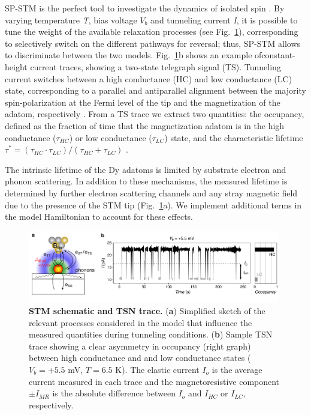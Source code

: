 \documentclass[
reprint,amsmath,amssymb,aps]{revtex4-2}
\begin{document}
SP-STM is the perfect tool to investigate the dynamics of isolated spin \cite{wiesendanger_ObservationVacuumTunneling_1990,Khajetoorians2013,paul_ControlMillisecondSpin_2017,Natterer2017,Natterer2018}. By varying temperature \textit{T}, bias voltage $V_b$ and tunneling current \textit{I}, it is possible to tune the weight of the available relaxation processes (see Fig.~\ref{fig:no_tip_tip_telegraph}), corresponding to selectively switch on the different pathways for reversal; thus, SP-STM allows to discriminate between the two models. 
Fig.~\ref{fig:no_tip_tip_telegraph}b shows an example ofconstant-height current traces, showing a two-state
telegraph signal (TS). Tunneling current switches between a high conductance (HC) and low conductance (LC) state, corresponding to a parallel and antiparallel alignment between the majority spin-polarization at the Fermi level of the tip and the magnetization of the adatom, respectively \cite{delgado2010,paul_ControlMillisecondSpin_2017}. From a TS trace we extract two quantities: the occupancy, defined as the fraction of time that the magnetization adatom is in the high conductance ($\tau_{HC}$) or low conductance ($\tau_{LC}$) state, and the characteristic lifetime $\tau ^*=(\tau_{HC}  \cdot \tau_{LC})/( \tau_{HC} + \tau_{LC})$ \cite{Khajetoorians2013}. 

The intrinsic lifetime of the Dy adatoms is limited by substrate electron and phonon scattering. In addition to these mechanisms, the measured lifetime is determined by further electron scattering channels and any stray magnetic field due to the presence of the STM tip (Fig.~\ref{fig:no_tip_tip_telegraph}a). We implement additional terms in the model Hamiltonian to account for these effects. 

\begin{figure}[ht!]
\includegraphics[width=0.98\textwidth]{Fig2_new.pdf}
\caption{\textbf{STM schematic and TSN trace.} (\textbf{a}) Simplified sketch of the relevant processes considered in the model that influence the measured quantities during tunneling conditions. (\textbf{b}) Sample TSN trace showing a clear asymmetry in occupancy (right graph) between high conductance and and low conductance states ($V_{b} = +5.5$ mV, $T = 6.5$ K). The elastic current $I_{o}$ is the average current measured in each trace and the magnetoresistive component $\pm I_{MR}$ is the absolute difference between $I_{o}$ and $I_{HC}$ or $I_{LC}$, respectively.
\label{fig:no_tip_tip_telegraph} }
\end{figure}
\end{document}
